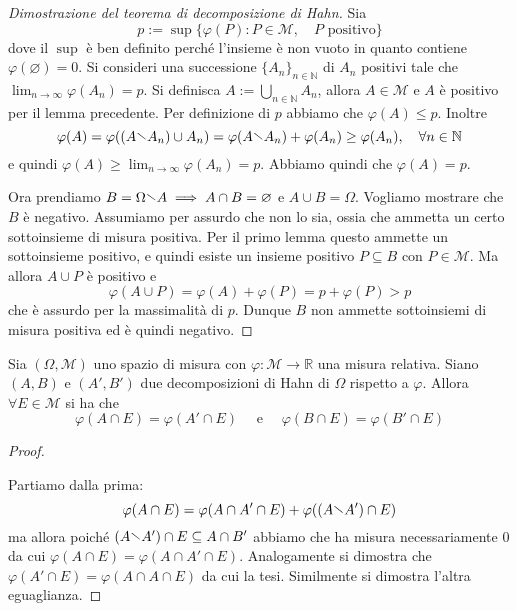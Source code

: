 \begin{proof}[Dimostrazione del teorema di decomposizione di Hahn]
    Sia
    \[
        p := \sup \{ \varphi(P) : P \in \mathcal{M}, \quad P \text{ positivo}\} 
    \]
    dove il \(\sup\) è ben definito perché l'insieme è non vuoto in quanto contiene \(\varphi(\varnothing) = 0\). Si consideri
    una successione \(\{A_{n}\}_{n \in \mathbb{N}} \) di \(A_{n}\) positivi
    tale che \(\lim_{n \to \infty} \varphi(A_{n}) = p\). Si definisca \(A := \bigcup_{n \in
    \mathbb{N}} A_{n}\), allora \(A \in \mathcal{M}\) e \(A\) è positivo per il
    lemma precedente. Per definizione di \(p\) abbiamo che \(\varphi(A) \le p\). Inoltre
    \[
        \varphi(A) = \varphi((A \sminus A_{n}) \cup A_{n}) = \varphi(A \sminus
        A_{n}) + \varphi(A_{n}) \ge \varphi(A_{n}), \quad \forall n \in \mathbb{N}
    \]
    e quindi \(\varphi(A) \ge \lim_{n \to \infty} \varphi(A_{n}) =  p\). Abbiamo
    quindi che \(\varphi(A) = p\).

    Ora prendiamo \(B = \Omega \sminus A \implies A \cap B = \varnothing\) e \(A
    \cup B = \Omega\). Vogliamo mostrare che \(B\) è negativo. Assumiamo per
    assurdo che non lo sia, ossia che ammetta un certo sottoinsieme di misura positiva. 
    Per il primo lemma questo ammette un sottoinsieme positivo, e quindi esiste un insieme positivo \(P \subseteq B \) con \(P
    \in \mathcal{M}\). Ma allora \(A \cup P\) è positivo e 
    \[
        \varphi(A \cup P) = \varphi(A) + \varphi(P) = p + \varphi(P) > p
    \]
    che è assurdo per la massimalità di \(p\). Dunque \(B\) non ammette sottoinsiemi
    di misura positiva ed è quindi negativo.
\end{proof}
\begin{theorem}
    Sia \((\Omega, \mathcal{M})\) uno spazio di misura con \(\varphi :
    \mathcal{M} \to \mathbb{R}\) una misura relativa. Siano \((A, B)\) e \((A',
    B')\) due decomposizioni di Hahn di \(\Omega\) rispetto a \(\varphi\).
    Allora \(\forall E \in \mathcal{M}\) si ha che 
    \[
        \varphi(A \cap E) = \varphi(A' \cap E) \quad \text{ e } \quad \varphi(B
        \cap E) = \varphi(B' \cap E)
    \]
\end{theorem}
\begin{proof}
\begin{figure}[ht]
    \centering
    \label{fig:diminvaranza}
\end{figure}
Partiamo dalla prima:
\[
    \varphi(A \cap E) = \varphi(A \cap A' \cap E) + \varphi((A \sminus A') \cap E)
\]
ma allora poiché \((A \sminus A') \cap E \subseteq A \cap B'\) abbiamo che ha
misura necessariamente \(0\) da cui \(\varphi(A \cap E) = \varphi(A \cap A' \cap
E)\). Analogamente si dimostra che \(\varphi(A' \cap E) = \varphi(A \cap A \cap
E)\) da cui la tesi. Similmente si dimostra l'altra eguaglianza.
\end{proof}

